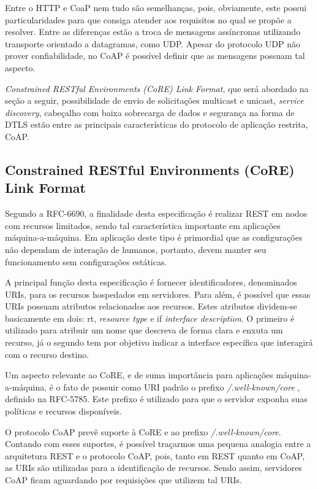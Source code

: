 Entre o HTTP e CoaP nem tudo são semelhanças, pois, obviamente, este possui particularidades para que consiga atender aos requisitos no qual se propõe a resolver.
Entre as diferenças estão a troca de mensagens assíncronas utilizando transporte orientado a datagramas, como UDP.
Apesar do protocolo UDP não prover confiabilidade, no CoAP é possível definir que as mensagens possuam tal aspecto.

\textit{Constrained RESTful Environments (CoRE) Link Format}, que será abordado na seção a seguir, possibilidade de envio de solicitações multicast e unicast, \textit{service discovery}, cabeçalho com baixa sobrecarga de dados e segurança na forma de DTLS\cite{rfc6347}
estão entre as principais características do protocolo de aplicação restrita, CoAP.

\subsection{Constrained RESTful Environments (CoRE) Link Format}

Segundo a RFC-6690, a finalidade desta especificação é realizar REST em nodos com recursos limitados, sendo tal característica importante em aplicações máquina-a-máquina\cite{rfc6690}.
Em aplicação deste tipo é primordial que as configurações não dependam de interação de humanos, portanto, devem manter seu funcionamento sem configurações estáticas.


A principal função desta especificação é fornecer identificadores, denominados URIs, para os recursos hospedados em servidores. 
Para além, é possível que essas URIs possuam atributos relacionados aos recursos.
Estes atributos dividem-se basicamente em dois: rt, \textit{resource type} e if \textit{interface description}.
O primeiro é utilizado para atribuir um nome que descreva de forma clara e enxuta um recurso,
já o segundo tem por objetivo indicar a interface específica que interagirá com o recurso destino.

Um aspecto relevante ao CoRE, e de suma importância para aplicações máquina-a-máquina, é o fato de possuir como URI padrão o prefixo \textit{/.well-known/core} , definido na RFC-5785\cite{rfc5785}.
Este prefixo é utilizado para que o servidor exponha suas políticas e recursos disponíveis.

O protocolo CoAP prevê suporte à CoRE e ao prefixo \textit{/.well-known/core}.
Contando com esses suportes, é possível traçarmos uma pequena analogia entre a arquitetura REST e o protocolo CoAP, pois, tanto em REST quanto em CoAP, as URIs são utilizadas para a identificação de recursos.
Sendo assim, servidores CoAP ficam aguardando por requisições que utilizem tal URIs.

